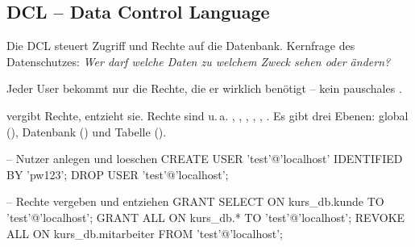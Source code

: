 \subsection{DCL -- Data Control Language}
Die DCL steuert Zugriff und Rechte auf die Datenbank. Kernfrage des Datenschutzes: \emph{Wer darf welche Daten zu welchem Zweck sehen oder ändern?}

\begin{merksatz}[Grundsatz]
Jeder User bekommt nur die Rechte, die er wirklich benötigt -- kein pauschales .
\end{merksatz}

 vergibt Rechte,  entzieht sie. Rechte sind u.\,a. , , , , , . Es gibt drei Ebenen: global (), Datenbank () und Tabelle ().

\begin{syntaxbox}[SQL]
-- Nutzer anlegen und loeschen
CREATE USER 'test'@'localhost' IDENTIFIED BY 'pw123';
DROP USER   'test'@'localhost';

-- Rechte vergeben und entziehen
GRANT SELECT ON kurs_db.kunde TO 'test'@'localhost';
GRANT ALL    ON kurs_db.*     TO 'test'@'localhost';
REVOKE ALL   ON kurs_db.mitarbeiter FROM 'test'@'localhost';
\end{syntaxbox}
